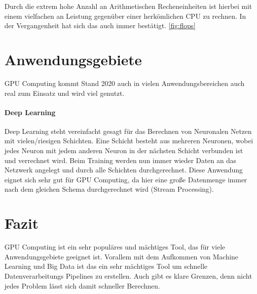 \documentclass[10pt,twocolumn]{article}          %
\begin{document}
Durch die extrem hohe Anzahl an Arithmetischen Recheneinheiten ist hierbei mit einem vielfachen an Leistung gegen\"uber einer herk\"omlichen CPU zu rechnen.
In der Vergangenheit hat sich das auch immer best\"atigt. \ref{fig:flops}

\section{Anwendungsgebiete}
GPU Computing kommt Stand 2020 auch in vielen Anwendungsbereichen auch real zum Einsatz und wird viel genutzt. 

\paragraph{Deep Learning}
Deep Learning steht vereinfacht gesagt f\"ur das Berechnen von Neuronalen Netzen mit vielen/riesigen Schichten.
Eine Schicht besteht aus mehreren Neuronen, wobei jedes Neuron mit jedem anderen Neuron in der n\"achsten Schicht verbunden ist und verrechnet wird.
Beim Training werden nun immer wieder Daten an das Netzwerk angelegt und durch alle Schichten durchgerechnet.
Diese Anwendung eignet sich sehr gut f\"ur GPU Computing, da hier eine große Datenmenge immer nach dem gleichen Schema durchgerechnet wird (Stream Processing).

\section{Fazit}
GPU Computing ist ein sehr popul\"ares und m\"achtiges Tool, das f\"ur viele Anwendungsgebiete geeignet ist. 
Vorallem mit dem Aufkommen von Machine Learning und Big Data ist das ein sehr m\"achtiges Tool um schnelle Datenverarbeitungs Pipelines zu erstellen.
Auch gibt es klare Grenzen, denn nicht jedes Problem l\"asst sich damit schneller Berechnen. 


\nocite{ex1,ex2}


\end{document}
